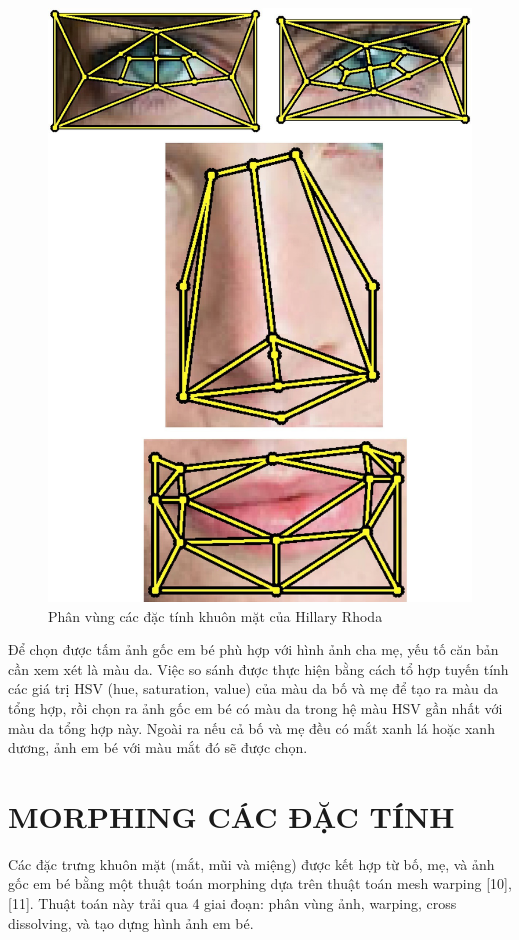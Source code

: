 \documentclass[journal]{IEEEtran}
\begin{document}
\begin{figure}[!t]
\centering
\includegraphics{Images/17}
\caption{Phân vùng các đặc tính khuôn mặt của Hillary Rhoda}
\label{refhinh4}
\end{figure}

Để chọn được tấm ảnh gốc em bé phù hợp với hình ảnh cha mẹ, yếu tố căn bản cần xem xét là màu da. Việc so sánh được thực hiện bằng cách tổ hợp tuyến tính các giá trị HSV (hue, saturation, value) của màu da bố và mẹ để tạo ra màu da tổng hợp, rồi chọn ra ảnh gốc em bé có màu da trong hệ màu HSV gần nhất với màu da tổng hợp này. Ngoài ra nếu cả bố và mẹ đều có mắt xanh lá hoặc xanh dương, ảnh em bé với màu mắt đó sẽ được chọn.

\section{MORPHING CÁC ĐẶC TÍNH}
Các đặc trưng khuôn mặt (mắt, mũi và miệng) được kết hợp từ bố, mẹ, và ảnh gốc em bé bằng một thuật toán morphing dựa trên thuật toán mesh warping [10], [11]. Thuật toán này trải qua 4 giai đoạn: phân vùng ảnh, warping, cross dissolving, và tạo dựng hình ảnh em bé.
\end{document}

